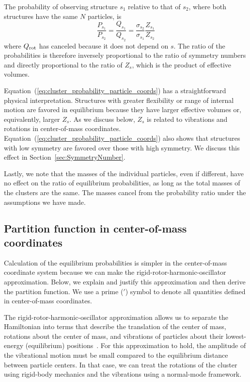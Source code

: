 \documentclass[pre, aps, twocolumn, reprint, amsmath,amssymb, showpacs,
superscriptaddress] {revtex4-1}
\begin{document}
The probability of observing structure $s_1$ relative to that of $s_2$,
where both structures have the same $N$ particles, is
\begin{equation}
	\frac{P_{s_1}}{P_{s_2}}=\frac{Q_{s_1}}{Q_{s_2}} = \frac{\sigma_{s_2}}{\sigma_{s_1}}\frac{Z_{s_1}}{Z_{s_2}}
  \label{eq:cluster_probability_particle_coords}
\end{equation}
where $Q_\textnormal{rot}$ has canceled because it does not depend on
$s$. The ratio of the probabilities is therefore inversely proportional
to the ratio of symmetry numbers and directly proportional to the ratio
of $Z_s$, which is the product of effective volumes.

Equation~(\ref{eq:cluster_probability_particle_coords}) has a
straightforward physical interpretation. Structures with greater
flexibility or range of internal motion are favored in equilibrium
because they have larger effective volumes or, equivalently, larger
$Z_s$. As we discuss below, $Z_s$ is related to vibrations and rotations
in center-of-mass coordinates.
Equation~(\ref{eq:cluster_probability_particle_coords}) also shows that
structures with low symmetry are favored over those with high symmetry.
We discuss this effect in Section~\ref{sec:SymmetryNumber}.

Lastly, we note that the masses of the individual particles, even if
different, have no effect on the ratio of equilibrium probabilities, as
long as the total masses of the clusters are the same. The masses cancel
from the probability ratio under the assumptions we have made.

\subsection{Partition function in center-of-mass coordinates}
\label{sec:Q_in_COM}

Calculation of the equilibrium probabilities is simpler in the
center-of-mass coordinate system because we can make the
rigid-rotor-harmonic-oscillator approximation. Below, we explain and
justify this approximation and then derive the partition function. We
use a prime ($'$) symbol to denote all quantities defined in
center-of-mass coordinates.

The rigid-rotor-harmonic-oscillator approximation allows us to separate
the Hamiltonian into terms that describe the translation of the center
of mass, rotations about the center of mass, and vibrations of particles
about their lowest-energy (equilibrium) positions~\cite{Wilson_1955}.
For this approximation to hold, the amplitude of the vibrational motion
must be small compared to the equilibrium distance between particle
centers. In that case, we can treat the rotations of the cluster using
rigid-body mechanics and the vibrations using a normal-mode framework.
\end{document}
